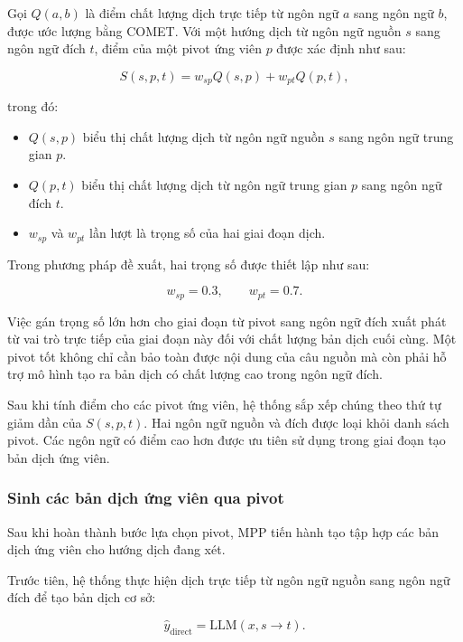 Gọi $Q(a,b)$ là điểm chất lượng dịch trực tiếp từ ngôn ngữ $a$ sang ngôn ngữ $b$, được ước lượng bằng COMET. Với một hướng dịch từ ngôn ngữ nguồn $s$ sang ngôn ngữ đích $t$, điểm của một pivot ứng viên $p$ được xác định như sau:

\begin{equation}
	S(s,p,t)
	=
	w_{sp}Q(s,p)
	+
	w_{pt}Q(p,t),
	\label{eq:pivot-score}
\end{equation}

trong đó:

\begin{itemize}
	\item $Q(s,p)$ biểu thị chất lượng dịch từ ngôn ngữ nguồn $s$ sang ngôn ngữ trung gian $p$.
	\item $Q(p,t)$ biểu thị chất lượng dịch từ ngôn ngữ trung gian $p$ sang ngôn ngữ đích $t$.
	\item $w_{sp}$ và $w_{pt}$ lần lượt là trọng số của hai giai đoạn dịch.
\end{itemize}

Trong phương pháp đề xuất, hai trọng số được thiết lập như sau:

\begin{equation}
	w_{sp}=0.3,\qquad w_{pt}=0.7.
\end{equation}

Việc gán trọng số lớn hơn cho giai đoạn từ pivot sang ngôn ngữ đích xuất phát từ vai trò trực tiếp của giai đoạn này đối với chất lượng bản dịch cuối cùng. Một pivot tốt không chỉ cần bảo toàn được nội dung của câu nguồn mà còn phải hỗ trợ mô hình tạo ra bản dịch có chất lượng cao trong ngôn ngữ đích.

Sau khi tính điểm cho các pivot ứng viên, hệ thống sắp xếp chúng theo thứ tự giảm dần của $S(s,p,t)$. Hai ngôn ngữ nguồn và đích được loại khỏi danh sách pivot. Các ngôn ngữ có điểm cao hơn được ưu tiên sử dụng trong giai đoạn tạo bản dịch ứng viên.

\subsubsection*{Sinh các bản dịch ứng viên qua pivot}

Sau khi hoàn thành bước lựa chọn pivot, MPP tiến hành tạo tập hợp các bản dịch ứng viên cho hướng dịch đang xét.

Trước tiên, hệ thống thực hiện dịch trực tiếp từ ngôn ngữ nguồn sang ngôn ngữ đích để tạo bản dịch cơ sở:

\begin{equation}
	\hat{y}_{\mathrm{direct}}
	=
	\mathrm{LLM}(x,s\rightarrow t).
\end{equation}

